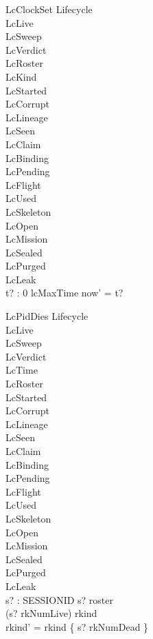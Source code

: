 \documentclass[a4paper,10pt,fleqn]{article}
\begin{document}
\begin{schema}{LcClockSet}
\Delta Lifecycle \\
\Xi LcLive \\
\Xi LcSweep \\
\Xi LcVerdict \\
\Xi LcRoster \\
\Xi LcKind \\
\Xi LcStarted \\
\Xi LcCorrupt \\
\Xi LcLineage \\
\Xi LcSeen \\
\Xi LcClaim \\
\Xi LcBinding \\
\Xi LcPending \\
\Xi LcFlight \\
\Xi LcUsed \\
\Xi LcSkeleton \\
\Xi LcOpen \\
\Xi LcMission \\
\Xi LcSealed \\
\Xi LcPurged \\
\Xi LcLeak \\
t? : 0 \upto lcMaxTime
\where
now' = t?
\end{schema}

\begin{schema}{LcPidDies}
\Delta Lifecycle \\
\Xi LcLive \\
\Xi LcSweep \\
\Xi LcVerdict \\
\Xi LcTime \\
\Xi LcRoster \\
\Xi LcStarted \\
\Xi LcCorrupt \\
\Xi LcLineage \\
\Xi LcSeen \\
\Xi LcClaim \\
\Xi LcBinding \\
\Xi LcPending \\
\Xi LcFlight \\
\Xi LcUsed \\
\Xi LcSkeleton \\
\Xi LcOpen \\
\Xi LcMission \\
\Xi LcSealed \\
\Xi LcPurged \\
\Xi LcLeak \\
s? : SESSIONID
\where
s? \in roster \\
(s? \mapsto rkNumLive) \in rkind \\
rkind' = rkind \oplus \{ s? \mapsto rkNumDead \}
\end{schema}
\end{document}

